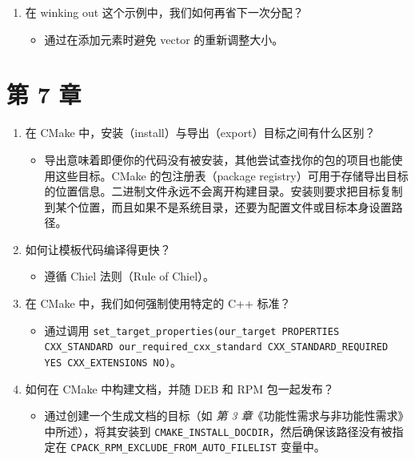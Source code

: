 \begin{enumerate}
\begin{itemize}
\item 内存竞技场（memory arena）与 placement new 运算符。内存竞技场有助于提升性能、改善内存局部性并简化内存管理。placement new 运算符作为一种优化手段，用于避免每次需要新实例时都重新分配内存。
\end{itemize}
\item 在 winking out 这个示例中，我们如何再省下一次分配？

\begin{itemize}
\item 通过在添加元素时避免 vector 的重新调整大小。
\end{itemize}
\end{enumerate}

\section*{第 7 章}

\begin{enumerate}
\item 在 CMake 中，安装（install）与导出（export）目标之间有什么区别？

\begin{itemize}
\item 导出意味着即便你的代码没有被安装，其他尝试查找你的包的项目也能使用这些目标。CMake 的包注册表（package registry）可用于存储导出目标的位置信息。二进制文件永远不会离开构建目录。安装则要求把目标复制到某个位置，而且如果不是系统目录，还要为配置文件或目标本身设置路径。
\end{itemize}
\item 如何让模板代码编译得更快？

\begin{itemize}
\item 遵循 Chiel 法则（Rule of Chiel）。
\end{itemize}
\item 在 CMake 中，我们如何强制使用特定的 C++ 标准？

\begin{itemize}
\item 通过调用 \texttt{set\_\allowbreak{}target\_\allowbreak{}properties(\allowbreak{}our\_\allowbreak{}target PROPERTIES CXX\_\allowbreak{}STANDARD our\_\allowbreak{}required\_\allowbreak{}cxx\_\allowbreak{}standard CXX\_\allowbreak{}STANDARD\_\allowbreak{}REQUIRED YES CXX\_\allowbreak{}EXTENSIONS NO)\allowbreak{}}。
\end{itemize}
\item 如何在 CMake 中构建文档，并随 DEB 和 RPM 包一起发布？

\begin{itemize}
\item 通过创建一个生成文档的目标（如 \emph{第 3 章}《功能性需求与非功能性需求》中所述），将其安装到 \texttt{CMAKE\_\allowbreak{}INSTALL\_\allowbreak{}DOCDIR}，然后确保该路径没有被指定在 \texttt{CPACK\_\allowbreak{}RPM\_\allowbreak{}EXCLUDE\_\allowbreak{}FROM\_\allowbreak{}AUTO\_\allowbreak{}FILELIST} 变量中。
\end{itemize}
\end{enumerate}

